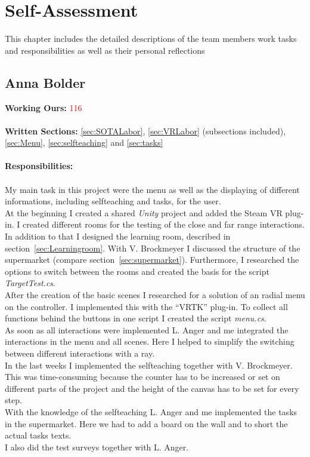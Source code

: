 \section{Self-Assessment} \label{sec:SA}

This chapter includes the detailed descriptions of the team members work tasks and responsibilities as well as their personal reflections


\subsection{Anna Bolder} \label{sec:SAAnna}

\textbf{Working Ours:} \textcolor{red}{116} \\ \\
\textbf{Written Sections:} \ref{sec:SOTALabor},  \ref{sec:VRLabor} (subsections included), \ref{sec:Menu}, \ref{sec:selfteaching} and \ref{sec:tasks} \\ \\
\textbf{Responsibilities:}\\ \\
My main task in this project were the menu as well as the displaying of different informations, including selfteaching and tasks, for the user. \\
At the beginning I created a shared \textit{Unity} project and added the Steam VR plug-in. I created different rooms for the testing of the close and far range interactions. In addition to that I designed the learning room, described in section~\ref{sec:Learningroom}. With V. Brockmeyer I discussed the structure of the supermarket (compare section~\ref{sec:supermarket}). Furthermore, I researched the options to switch between the rooms and created the basis for the script \textit{TargetTest.cs}.\\
After the creation of the basic scenes I researched for a solution of an radial menu on the controller. I implemented this with the ``VRTK'' plug-in. To collect all functions behind the buttons in one script I created the script \textit{menu.cs}.\\
As soon as all interactions were implemented L. Anger and me integrated the interactions in the menu and all scenes. Here I helped to simplify the switching between different interactions with a ray. \\
In the last weeks I implemented the selfteaching together with V. Brockmeyer. This was time-consuming because the counter has to be increased or set on different parts of the project and the height of the canvas has to be set for every step.\\
With the knowledge of the selfteaching L. Anger and me implemented the tasks in the supermarket. Here we had to add a board on the wall and to short the actual tasks texts. \\
I also did the test surveys together with L. Anger.\\

